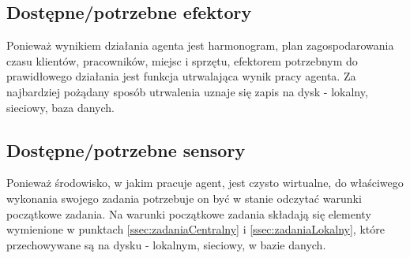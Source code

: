 
\subsection{Dostępne/potrzebne efektory}
Ponieważ wynikiem działania agenta jest harmonogram, plan zagospodarowania czasu klientów,
pracowników, miejsc i sprzętu, efektorem potrzebnym do prawidłowego działania jest funkcja
utrwalająca wynik pracy agenta. Za najbardziej pożądany sposób utrwalenia uznaje się zapis
na dysk - lokalny, sieciowy, baza danych.

\subsection{Dostępne/potrzebne sensory}
Ponieważ środowisko, w jakim pracuje agent, jest czysto wirtualne, do właściwego wykonania
swojego zadania potrzebuje on być w stanie odczytać warunki początkowe zadania. Na warunki
początkowe zadania składają się elementy wymienione w punktach \ref{ssec:zadaniaCentralny} i \ref{ssec:zadaniaLokalny},
które przechowywane są na dysku - lokalnym, sieciowy, w bazie danych.

